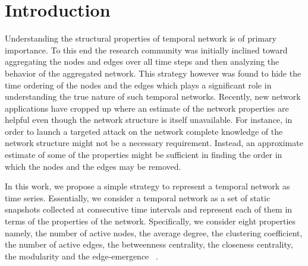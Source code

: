 \noindent
\section{Introduction}
\label{introduction}
\iffalse
Recently the research community is reaching a consensus that many real 
networks have nodes and edges entering or leaving the system dynamically, thus making temporal networks a better way of representing these networks. 
Initial studies on temporal networks have been performed by aggregating the nodes and edges over all time 
steps and then analyzing the behavior of the aggregated network. This strategy however hides the time ordering of the nodes and the edges 
which may have a significant role in the understanding of 
the true nature of such temporal networks.
Researchers have subsequently come up with growth models and have proposed several metrics. Tang et al. have showed in ~\cite{TSMML10:smallworld} 
the presence of correlation and small world 
behavior in temporal networks. In ~\cite{stehle2010dynamical} the temporal network of human communication has been identified to be bursty in nature.
\fi
Understanding the structural properties of temporal network is of primary importance. To this end the research community was initially inclined toward 
aggregating the nodes and edges over all time 
steps and then analyzing the behavior of the aggregated network. This strategy however was found to hide the time ordering of the nodes and the edges 
which plays a significant role in understanding  
the true nature of such temporal networks. 
Recently, new network applications have cropped up where an estimate of the network properties are helpful even though the network structure is itself unavailable. 
For instance, in order to launch a targeted attack on the network complete knowledge of the network structure might not be a necessary requirement. Instead, an approximate estimate of some 
of the properties might be sufficient in finding the order in which the nodes and the edges may be removed. 

In this work, 
we propose a simple strategy to represent a temporal network as time series. Essentially, we consider a temporal network as a set of static snapshots collected 
at consecutive time intervals and represent each of them in terms of the properties of the network. Specifically, we consider eight properties namely, the number of 
active nodes, the average degree, the clustering coefficient, the number of active edges, the betweenness centrality, the closeness 
centrality, the modularity and the edge-emergence ~\cite{sur2014attack}. 


